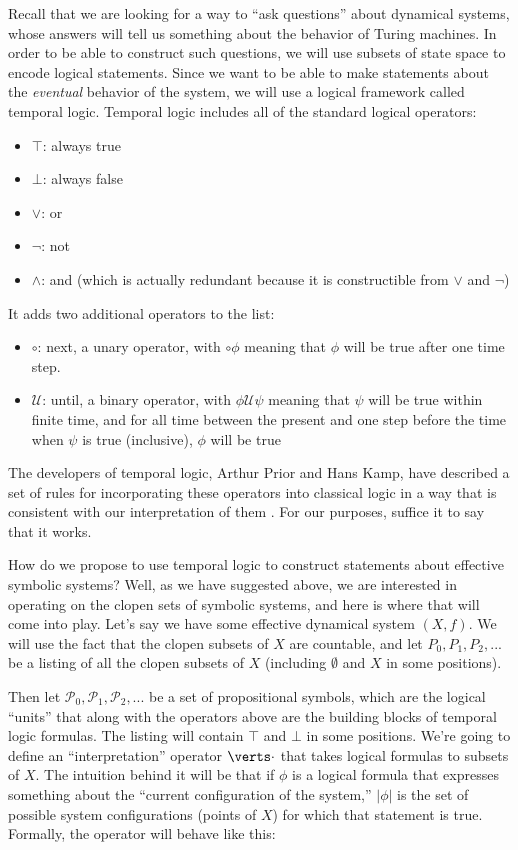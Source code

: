 \documentclass{fkpaper}
\newcommand{\lnext}{\circ}
\newcommand{\ltil}{\mathcal{U}}
\newcommand{\psc}{\mathcal{P}}
\begin{document}
\begin{multicols}{2}
  Recall that we are looking for a way to ``ask questions'' about
  dynamical systems, whose answers will tell us something about the
  behavior of Turing machines. In order to be able to construct such
  questions, we will use subsets of state space to encode logical
  statements. Since we want to be able to make statements about the {\it
    eventual} behavior of the system, we will use a logical framework
  called temporal logic. Temporal logic includes all of the standard
  logical operators:
  \begin{itemize}
    \item $\top$: always true
    \item $\bot$: always false
    \item $\lor$: or
    \item $\lnot$: not
    \item $\land$: and (which is actually redundant because it is constructible from $\lor$ and $\lnot$)
  \end{itemize}
  It adds two additional operators to the list:
  \begin{itemize}
    \item $\lnext$: next, a unary operator, with $\lnext \phi$ meaning
      that $\phi$ will be true after one time step.
    \item $\ltil$: until, a binary operator, with $\phi \ltil \psi$
      meaning that $\psi$ will be true within finite time, and for all
      time between the present and one step before the time when $\psi$
      is true (inclusive), $\phi$ will be true
  \end{itemize}

  The developers of temporal logic, Arthur Prior and Hans Kamp, have
  described a set of rules for incorporating these operators into
  classical logic in a way that is consistent with our interpretation of
  them \cite{Delvenne2004Apr}. For our purposes, suffice it to say that
  it works.

  How do we propose to use temporal logic to construct statements about
  effective symbolic systems? Well, as we have suggested above, we are
  interested in operating on the clopen sets of symbolic systems, and
  here is where that will come into play. Let's say we have some
  effective dynamical system $(X, f)$. We will use the fact that the
  clopen subsets of $X$ are countable, and let $P_0, P_1, P_2, ...$ be a
  listing of all the clopen subsets of $X$ (including $\emptyset$ and
  $X$ in some positions).

  Then let $\psc_0, \psc_1, \psc_2, ...$ be a set of propositional
  symbols, which are the logical ``units'' that along with the operators
  above are the building blocks of temporal logic formulas. The listing
  will contain $\top$ and $\bot$ in some positions. We're going to
  define an ``interpretation'' operator $\abs{\cdot}$ that takes logical
  formulas to subsets of $X$. The intuition behind it will be that if
  $\phi$ is a logical formula that expresses something about the
  ``current configuration of the system,'' $|\phi|$ is the set of
  possible system configurations (points of $X$) for which that
  statement is true. Formally, the operator will behave like this:


\end{multicols}
\end{document}
